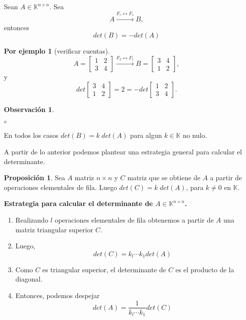 \documentclass{article}
\theoremstyle{definition}
\theoremstyle{definition}
\newtheorem*{obs}{Observación}
\newtheorem{prop}[teo]{Proposición}
\newtheorem*{ej}{Por ejemplo}
\theoremstyle{remark}
\begin{document}
\begin{teo}[E3]
  Sean $A \in \mathbb{K}^{n \times n}$. Sea \[
    A \xrightarrow{F_r \leftrightarrow F_s} B,
  \]
  entonces \[
det(B)=-det(A)
  \]
\end{teo}
\begin{ej}[verificar cuentas]
  \[
    A=\begin{bmatrix}1 & 2 \\ 3 & 4 \end{bmatrix} \xrightarrow{F_2 \leftrightarrow F_1} B = \begin{bmatrix} 3  & 4 \\ 1 & 2 \end{bmatrix},
  \]
  y 
  \[
    det \begin{bmatrix} 3 & 4 \\ 1 & 2 \end{bmatrix} = 2 = -det \begin{bmatrix} 1 & 2 \\ 3 & 4 \end{bmatrix}.
  \]
\end{ej}
  \begin{obs}\;
\begin{list}{$\circ$}{}  
\item  En todos los casos $det(B)=k \; det(A)$ para algun $k \in \mathbb{K}$ no nulo.
\item A partir de lo anterior podemos plantear una estrategia general para calcular el determinante.
\end{list}\end{obs}
\begin{prop}
  Sea $A$ matriz $n \times n$ y $C$ matriz que se obtiene de $A$ a partir de operaciones elementales de fila. Luego $det(C)=k \; det(A)$, para $k \neq 0$ en $\mathbb{K}$.
\end{prop}
\begin{center}
  \textbf{Estrategia para calcular el determinante de $A \in \mathbb{K}^{n \times n}$.}
\end{center}
\begin{enumerate}[label=\arabic*.]
  \item Realizando $l$ operaciones elementales de fila obtenemos a partir de $A$ una matriz triangular superior $C$.
  \item Luego, \[
det(C)=k_l\cdots k_1 det(A)
    \]
  \item Como $C$ es triangular superior, el determinante de $C$ es el producto de la diagonal. 
  \item Entonces, podemos despejar \[
      det(A)=\frac{1}{k_l \cdots k_1} det(C)
    \]
  \end{enumerate}
  \pagebreak
\end{document}
